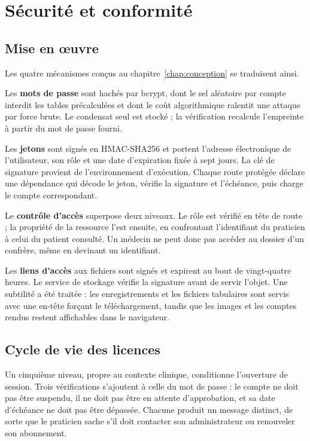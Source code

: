 \section{Sécurité et conformité}

\subsection{Mise en œuvre}

Les quatre mécanismes conçus au chapitre~\ref{chap:conception} se traduisent ainsi.

Les \textbf{mots de passe} sont hachés par bcrypt, dont le sel aléatoire par compte
interdit les tables précalculées et dont le coût algorithmique ralentit une attaque
par force brute. Le condensat seul est stocké ; la vérification recalcule l'empreinte
à partir du mot de passe fourni.

Les \textbf{jetons} sont signés en HMAC-SHA256 et portent l'adresse électronique de
l'utilisateur, son rôle et une date d'expiration fixée à sept jours. La clé de
signature provient de l'environnement d'exécution. Chaque route protégée déclare une
dépendance qui décode le jeton, vérifie la signature et l'échéance, puis charge le
compte correspondant.

Le \textbf{contrôle d'accès} superpose deux niveaux. Le rôle est vérifié en tête de
route ; la propriété de la ressource l'est ensuite, en confrontant l'identifiant du
praticien à celui du patient consulté. Un médecin ne peut donc pas accéder au dossier
d'un confrère, même en devinant un identifiant.

Les \textbf{liens d'accès} aux fichiers sont signés et expirent au bout de vingt-quatre
heures. Le service de stockage vérifie la signature avant de servir l'objet. Une
subtilité a été traitée : les enregistrements et les fichiers tabulaires sont servis
avec une en-tête forçant le téléchargement, tandis que les images et les comptes rendus
restent affichables dans le navigateur.

\subsection{Cycle de vie des licences}

Un cinquième niveau, propre au contexte clinique, conditionne l'ouverture de session.
Trois vérifications s'ajoutent à celle du mot de passe : le compte ne doit pas être
suspendu, il ne doit pas être en attente d'approbation, et sa date d'échéance ne doit
pas être dépassée. Chacune produit un message distinct, de sorte que le praticien sache
s'il doit contacter son administrateur ou renouveler son abonnement.

